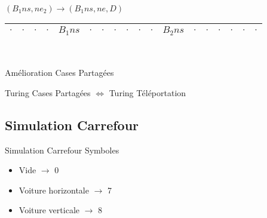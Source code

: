 \documentclass[12pt]{beamer}
\begin{document}
\begin{frame}{}
\begin{center}
\begin{tabular}{|c|c|c|c|c|c|c|c|c|c|c|c|c|c|c|c|c|c|}
\end{tabular}\\

        \pause

\vspace{0.5cm}

    $(B_1ns,ne_2) \longrightarrow (B_1ns, ne, D)$\\
    

\begin{tabular}{|c|c|c|c|c|c|c|c|c|c|c|c|c|c|c|c|c|c|}\hline
     $\cdot$ & $\cdot$ & $\cdot$ & $\cdot$ & $B_1ns$ & $\cdot$ & $\cdot$ & $\cdot$ & $\cdot$ & $\cdot$ & $\cdot$ & $B_2ns$ & $\cdot$ & $\cdot$ & $\cdot$ & $\cdot$ & $\cdot$ & $\cdot$ \\\hline    
     
\end{tabular}\\

    \end{center}
\end{frame}

\begin{frame}{Amélioration Cases Partagées}
\begin{center}
    \begin{tcolorbox}[colframe=red, hbox]
    \large Turing Cases Partagées $\Longleftrightarrow$ Turing Téléportation
\end{tcolorbox}
\end{center}

\end{frame}

\subsection{Simulation Carrefour}
\begin{frame}{Simulation Carrefour}
    Symboles
    \begin{itemize}
    \vspace{1cm}
        \item Vide $\longrightarrow$ 0 \\
        \vspace{1cm}
        \item Voiture horizontale $\longrightarrow$ 7 \\
        \vspace{1cm}
        \item Voiture verticale $\longrightarrow$ 8 \\
    \end{itemize}
\end{frame}
\end{document}
